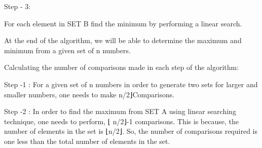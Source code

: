 \documentclass[letterpaper,portrait,12pt]{article}
\begin{document}
\begin{flushleft}

\end{flushleft}


\begin{flushleft}
Step - 3:
\end{flushleft}


\begin{flushleft}
For each element in SET B find the minimum by performing a linear search.
\end{flushleft}


\begin{flushleft}

\end{flushleft}


\begin{flushleft}
At the end of the algorithm, we will be able to determine the maximum and minimum from a given set of n numbers.
\end{flushleft}


\begin{flushleft}

\end{flushleft}


\begin{flushleft}
Calculating the number of comparisons made in each step of the algorithm:
\end{flushleft}


\begin{flushleft}

\end{flushleft}


\begin{flushleft}
Step -1 : For a given set of n numbers in order to generate two sets for larger and smaller numbers, one needs to make  n/2⌋Comparisons.
\end{flushleft}


\begin{flushleft}

\end{flushleft}


\begin{flushleft}
Step -2 :  In order to find the maximum from SET A using linear searching technique, one needs to perform, ⌊ n/2⌋-1 comparisons. This is because, the number of elements in the set is ⌊n/2⌋. So, the number of comparisons required is one less than the total number of elements in the set.
\end{flushleft}
\end{document}
